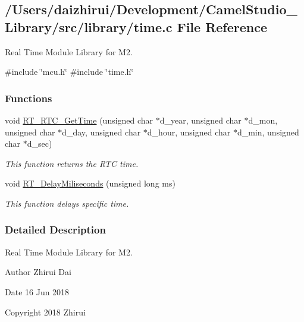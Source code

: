 \hypertarget{a00089}{}\subsection{/\+Users/daizhirui/\+Development/\+Camel\+Studio\+\_\+\+Library/src/library/time.c File Reference}
\label{a00089}


Real Time Module Library for M2.  


{\ttfamily \#include \char`\"{}mcu.\+h\char`\"{}}\newline
{\ttfamily \#include \char`\"{}time.\+h\char`\"{}}\newline
\subsubsection*{Functions}
\begin{DoxyCompactItemize}
\item 
void \mbox{\hyperlink{a00089_ae30dec10f77cab56a66ee070fbe6a490}{R\+T\+\_\+\+R\+T\+C\+\_\+\+Get\+Time}} (unsigned char $\ast$d\+\_\+year, unsigned char $\ast$d\+\_\+mon, unsigned char $\ast$d\+\_\+day, unsigned char $\ast$d\+\_\+hour, unsigned char $\ast$d\+\_\+min, unsigned char $\ast$d\+\_\+sec)
\begin{DoxyCompactList}\small\item\em This function returns the R\+TC time. \end{DoxyCompactList}\item 
void \mbox{\hyperlink{a00089_a960534919351d6e419e70a78521e87da}{R\+T\+\_\+\+Delay\+Miliseconds}} (unsigned long ms)
\begin{DoxyCompactList}\small\item\em This function delays specific time. \end{DoxyCompactList}\end{DoxyCompactItemize}


\subsubsection{Detailed Description}
Real Time Module Library for M2. 

\begin{DoxyAuthor}{Author}
Zhirui Dai 
\end{DoxyAuthor}
\begin{DoxyDate}{Date}
16 Jun 2018 
\end{DoxyDate}
\begin{DoxyCopyright}{Copyright}
2018 Zhirui 
\end{DoxyCopyright}


